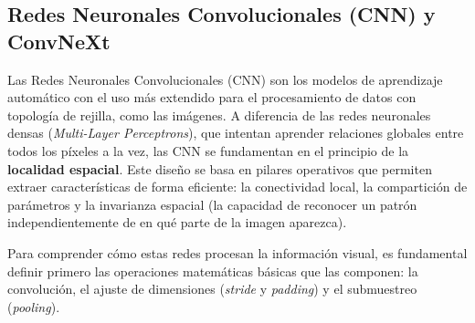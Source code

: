 \documentclass[12pt, oneside, english, spanish]{book}
\begin{document}
\subsection{Redes Neuronales Convolucionales (CNN) y ConvNeXt} \label{subsec:cnn_convnext}

Las Redes Neuronales Convolucionales (CNN) son los modelos de aprendizaje automático con el uso más extendido para el procesamiento de datos con topología de rejilla, como las imágenes. A diferencia de las redes neuronales densas (\textit{Multi-Layer Perceptrons}), que intentan aprender relaciones globales entre todos los píxeles a la vez, las CNN se fundamentan en el principio de la \textbf{localidad espacial}. Este diseño se basa en pilares operativos que permiten extraer características de forma eficiente: la conectividad local, la compartición de parámetros y la invarianza espacial (la capacidad de reconocer un patrón independientemente de en qué parte de la imagen aparezca).

Para comprender cómo estas redes procesan la información visual, es fundamental definir primero las operaciones matemáticas básicas que las componen: la convolución, el ajuste de dimensiones (\textit{stride} y \textit{padding}) y el submuestreo (\textit{pooling}).
\end{document}
